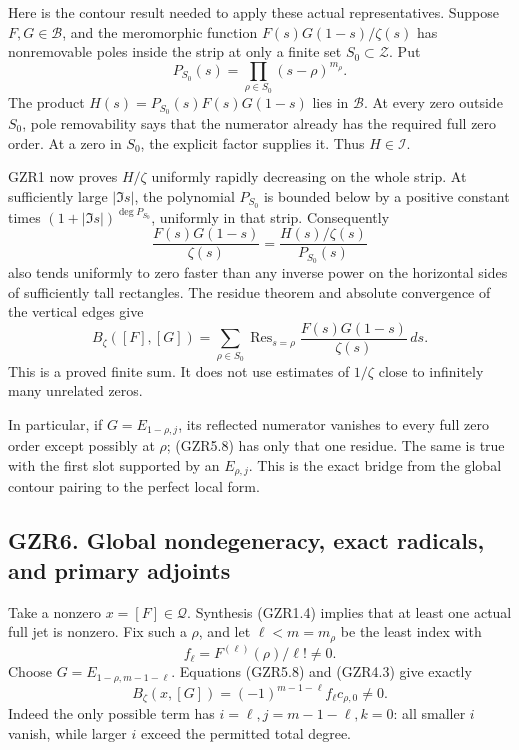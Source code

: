 Here is the contour result needed to apply these actual representatives.
Suppose \(F,G\in\mathcal B\), and the meromorphic function
\(F(s)G(1-s)/\zeta(s)\) has nonremovable poles inside the strip at only
a finite set \(S_0\subset\mathscr Z\). Put \[
P_{S_0}(s)=\prod_{\rho\in S_0}(s-\rho)^{m_\rho}.
\tag{GZR5.7}
\] The product \(H(s)=P_{S_0}(s)F(s)G(1-s)\) lies in \(\mathcal B\). At
every zero outside \(S_0\), pole removability says that the numerator
already has the required full zero order. At a zero in \(S_0\), the
explicit factor supplies it. Thus \(H\in\mathcal I\).

GZR1 now proves \(H/\zeta\) uniformly rapidly decreasing on the whole
strip. At sufficiently large \(|\Im s|\), the polynomial \(P_{S_0}\) is
bounded below by a positive constant times
\((1+|\Im s|)^{\deg P_{S_0}}\), uniformly in that strip. Consequently \[
\frac{F(s)G(1-s)}{\zeta(s)}
=\frac{H(s)/\zeta(s)}{P_{S_0}(s)}
\] also tends uniformly to zero faster than any inverse power on the
horizontal sides of sufficiently tall rectangles. The residue theorem
and absolute convergence of the vertical edges give \[
B_\zeta([F],[G])
=\sum_{\rho\in S_0}
\operatorname{Res}_{s=\rho}
\frac{F(s)G(1-s)}{\zeta(s)}\,ds .
\tag{GZR5.8}
\] This is a proved finite sum. It does not use estimates of \(1/\zeta\)
close to infinitely many unrelated zeros.

In particular, if \(G=E_{1-\rho,j}\), its reflected numerator vanishes
to every full zero order except possibly at \(\rho\); (GZR5.8) has only
that one residue. The same is true with the first slot supported by an
\(E_{\rho,j}\). This is the exact bridge from the global contour pairing
to the perfect local form.

\subsection{GZR6. Global nondegeneracy, exact radicals, and primary
adjoints}\label{gzr6.-global-nondegeneracy-exact-radicals-and-primary-adjoints}

Take a nonzero \(x=[F]\in\mathcal Q\). Synthesis (GZR1.4) implies that
at least one actual full jet is nonzero. Fix such a \(\rho\), and let
\(\ell<m=m_\rho\) be the least index with \[
f_\ell=F^{(\ell)}(\rho)/\ell!\ne0.
\] Choose \(G=E_{1-\rho,m-1-\ell}\). Equations (GZR5.8) and (GZR4.3)
give exactly \[
B_\zeta(x,[G])
=(-1)^{m-1-\ell} f_\ell c_{\rho,0}\ne0.
\tag{GZR6.1}
\] Indeed the only possible term has \(i=\ell,j=m-1-\ell,k=0\): all
smaller \(i\) vanish, while larger \(i\) exceed the permitted total
degree.

